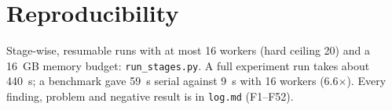 \documentclass[10pt,a4paper]{article}
\begin{document}
\section{Reproducibility}
Stage-wise, resumable runs with at most 16 workers (hard ceiling 20) and a 16~GB memory budget: \texttt{run\_stages.py}. A full experiment run takes about 440~s; a benchmark gave 59~s serial against 9~s with 16 workers (6.6$\times$). Every finding, problem and negative result is in \texttt{log.md} (F1--F52).
\end{document}
